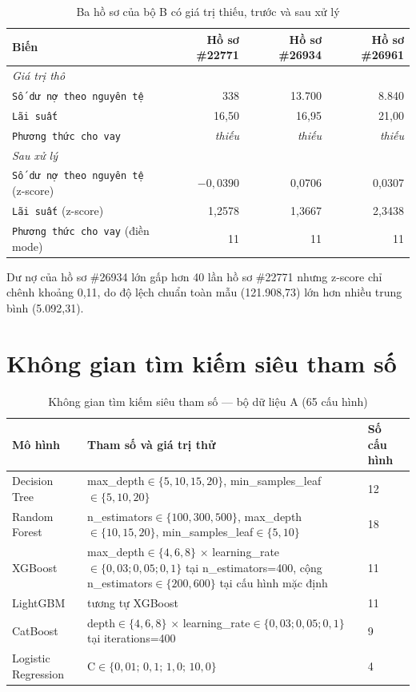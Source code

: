 \begin{table}[H]
\centering
\caption{Ba hồ sơ của bộ B có giá trị thiếu, trước và sau xử lý}
\label{tab:example-b}
\begin{tabular}{|l|r|r|r|}
\hline
Biến & Hồ sơ \#22771 & Hồ sơ \#26934 & Hồ sơ \#26961\\
\hline
\multicolumn{4}{|l|}{\textit{Giá trị thô}}\\
\hline
\texttt{Số dư nợ theo nguyên tệ} & 338 & 13.700 & 8.840\\
\texttt{Lãi suất} & 16,50 & 16,95 & 21,00\\
\texttt{Phương thức cho vay} & \textit{thiếu} & \textit{thiếu} & \textit{thiếu}\\
\hline
\multicolumn{4}{|l|}{\textit{Sau xử lý}}\\
\hline
\texttt{Số dư nợ theo nguyên tệ} (z-score) & $-0,0390$ & 0,0706 & 0,0307\\
\texttt{Lãi suất} (z-score) & 1,2578 & 1,3667 & 2,3438\\
\texttt{Phương thức cho vay} (điền mode) & 11 & 11 & 11\\
\hline
\end{tabular}
\end{table}

Dư nợ của hồ sơ \#26934 lớn gấp hơn 40 lần hồ sơ \#22771 nhưng z-score chỉ chênh khoảng 0,11, do độ lệch chuẩn toàn mẫu (121.908,73) lớn hơn nhiều trung bình (5.092,31).

\section{Không gian tìm kiếm siêu tham số}

{\footnotesize
\begin{table}[H]
\centering
\caption{Không gian tìm kiếm siêu tham số --- bộ dữ liệu A (65 cấu hình)}
\label{tab:grid-design}
\begin{tabular}{|p{2.6cm}|p{9.3cm}|p{1.2cm}|}
\hline
Mô hình & Tham số và giá trị thử & Số cấu hình\\
\hline
Decision Tree & max\_depth$\in\{5,10,15,20\}$, min\_samples\_leaf$\in\{5,10,20\}$ & 12\\
\hline
Random Forest & n\_estimators$\in\{100,300,500\}$, max\_depth$\in\{10,15,20\}$, min\_samples\_leaf$\in\{5,10\}$ & 18\\
\hline
XGBoost & max\_depth$\in\{4,6,8\}$ $\times$ learning\_rate$\in\{0{,}03;0{,}05;0{,}1\}$ tại n\_estimators=400, cộng n\_estimators$\in\{200,600\}$ tại cấu hình mặc định & 11\\
\hline
LightGBM & tương tự XGBoost & 11\\
\hline
CatBoost & depth$\in\{4,6,8\}$ $\times$ learning\_rate$\in\{0{,}03;0{,}05;0{,}1\}$ tại iterations=400 & 9\\
\hline
Logistic Regression & C$\in\{0{,}01;\,0{,}1;\,1{,}0;\,10{,}0\}$ & 4\\
\hline
\end{tabular}
\end{table}
}


